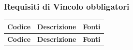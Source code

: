 \subsubsection{Requisiti di Vincolo obbligatori}
\renewcommand{\arraystretch}{1.15}
\begin{longtable}{|>{\raggedright}p{}|>{\raggedright\arraybackslash}p{}|>{\raggedright\arraybackslash}p{}|}

    \hline
    \rowcolor[gray]{0.9}
    \textbf{Codice} & \textbf{Descrizione} & \textbf{Fonti} \\
    \hline
    \endfirsthead
    
    \hline
    \rowcolor[gray]{0.9}
    \textbf{Codice} & \textbf{Descrizione} & \textbf{Fonti}  \\
    \hline
    \endhead


\end{longtable}
